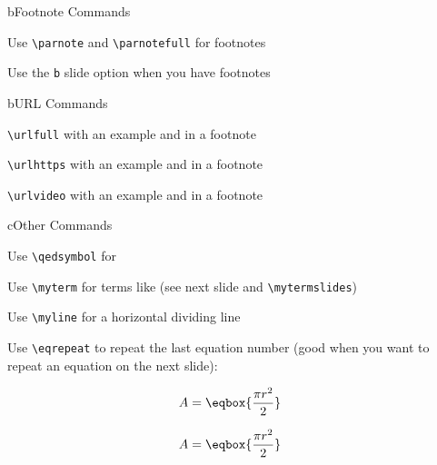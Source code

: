 \begin{myslidefragile}{b}{Footnote Commands}

Use \lstinline{\parnote} and \lstinline{\parnotefull} for footnotes

Use the \lstinline{b} slide option when you have footnotes

\end{myslidefragile}

\begin{myslidefragile}{b}{URL Commands}

\lstinline{\urlfull} with an example  and in a footnote

\lstinline{\urlhttps} with an example  and in a footnote


\lstinline{\urlvideo} with an example  and in a footnote

\end{myslidefragile}

\begin{myslidefragile}{c}{Other Commands}

Use \lstinline{\qedsymbol} for \qedsymbol

Use \lstinline{\myterm} for terms like  (see next slide and \lstinline{\mytermslides})

Use \lstinline{\myline} for a horizontal dividing line


Use \lstinline{\eqrepeat} to repeat the last equation number (good when you want to repeat an equation on the next slide):

\begin{align}
A & = \eqbox{\frac{\pi r^2}{2}}
\end{align}

\eqrepeat

\begin{align}
A & = \eqbox{\frac{\pi r^2}{2}}
\end{align}


\end{myslidefragile}

